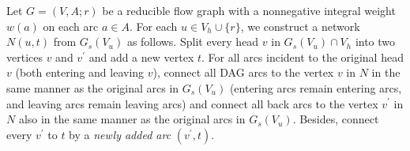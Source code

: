 \documentclass[11pt]{article}
\begin{document}
Let $G=(V,A;r)$ be a reducible flow graph with a nonnegative integral weight $w(a)$ on each arc $a\in A$. For each $u\in V_h\cup\{r\}$, we construct a network $N(u,t)$ from $G_s(V_u)$ as follows. Split every head $v$ in $G_s(V_u)\cap V_h$ into two vertices $v$ and $v^\prime$ and add a new vertex $t$. For all arcs incident to the original head $v$ (both entering and leaving $v$), connect all DAG arcs to the vertex $v$ in $N$ in the same manner as the original arcs in $G_s(V_u)$ (entering arcs remain entering arcs, and leaving arcs remain leaving arcs) and connect all back arcs to the vertex $v^\prime$ in $N$ also in the same manner as the original arcs in $G_s(V_u)$. Besides, connect every $v^\prime$ to $t$ by a \emph{newly added arc} $(v^\prime,t)$. 

\begin{figure}
    \centering
\end{figure}
\end{document}
